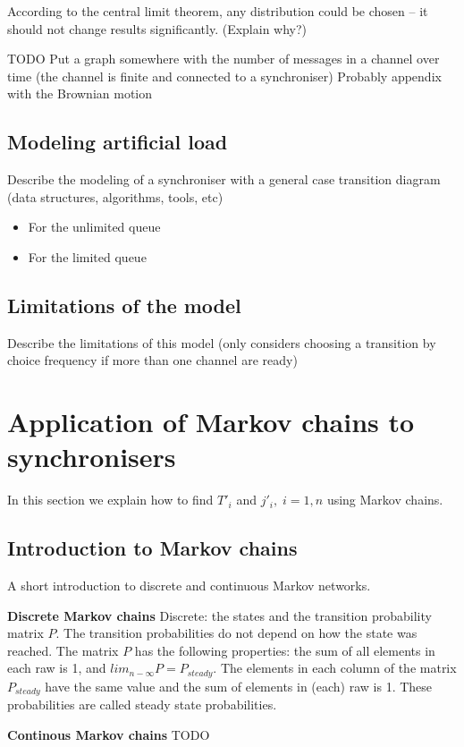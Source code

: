 According to the central limit theorem, any distribution could be chosen -- it should not change results significantly. (Explain why?)

TODO Put a graph somewhere with the number of messages in a channel over time (the channel is finite and connected to a synchroniser) Probably appendix with the Brownian motion

  \subsection{Modeling artificial load}
Describe the modeling of a synchroniser with a general case transition diagram (data structures, algorithms, tools, etc)
    \begin{itemize}
    \item For the unlimited queue
    \item For the limited queue
    \end{itemize}

  \subsection{Limitations of the model}
Describe the limitations of this model (only considers choosing a transition by choice frequency if more than one channel are ready)


\section{Application of Markov chains to synchronisers}
In this section we explain how to find $T'_{i}$ and $j'_{i}, \; i=1,n$ using Markov chains.
  \subsection{Introduction to Markov chains}
A short introduction to discrete and continuous Markov networks.

\textbf{Discrete Markov chains}
Discrete: the states and the transition probability matrix $P$. The transition probabilities do not depend on how the state was reached. The matrix $P$ has the following properties: the sum of all elements in each raw is 1, and $lim_{n - \infty} P = P_{steady}$. The elements in each column of the matrix $P_{steady}$ have the same value and the sum of elements in (each) raw is 1. These probabilities are called steady state probabilities.

\textbf{Continous Markov chains}
TODO

